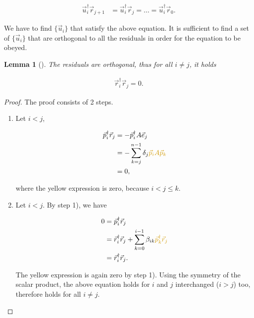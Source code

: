\documentclass{article}
\theoremstyle{plain} %
\newtheorem{lemma}[theorem]{Lemma}
\theoremstyle{convention} %
\theoremstyle{remark} %
\numberwithin{equation}{section}
\begin{document}
\begin{align*}
    \vec{u}_i^{\dagger} \vec{r}_{j+1} &= \vec{u}_i^{\dagger} \vec{r}_j = \dots = \vec{u}_i^{\dagger} \vec{r}_0.
\end{align*}

We have to find $\{\vec{u}_i\}$ that satisfy the above equation. It is sufficient to find a set of $\{\vec{u}_i\}$ that are orthogonal to all the residuals in order for the equation to be obeyed.

\begin{lemma}[]
\label{lem:rorthogonality}
The residuals are orthogonal, thus for all $i \neq j$, it holds

\begin{align*}
    \vec{r}_i^{\dagger} \vec{r}_j = 0.
\end{align*}

\end{lemma}

\begin{proof}

The proof consists of 2 steps.

\begin{enumerate}[label={\arabic*)}]
    \item Let $i<j$,

    \begin{align*}
        \vec{p}_i^{\dagger} \vec{r}_j &= - \vec{p}_i^{\dagger} A \vec{e}_j \\
                                      &= - \sum_{k=j}^{n-1} \delta_j \textcolor{cyellow}{\vec{p}_i A \vec{p}_k} \\
                                      &= 0,
    \end{align*}

    where the \textcolor{cyellow}{yellow} expression is \textcolor{cyellow}{zero}, because $i<j\leq k$.

    \item Let $i<j$. By step 1), we have

    \begin{align*}
        0 &= \vec{p}_i^{\dagger} \vec{r}_j \\
          &= \vec{r}_i^{\dagger} \vec{r}_j + \sum_{k=0}^{i-1} \beta_{ik} \textcolor{cyellow}{\vec{p}_k^{\dagger} \vec{r}_j} \\
          &= \vec{r}_i^{\dagger} \vec{r}_j.
    \end{align*}

    The \textcolor{cyellow}{yellow} expression is again \textcolor{cyellow}{zero} by step 1). Using the symmetry of the scalar product, the above equation holds for $i$ and $j$ interchanged ($i>j$) too, therefore holds for all $i \neq j$.

\end{enumerate}

\end{proof}
\end{document}
